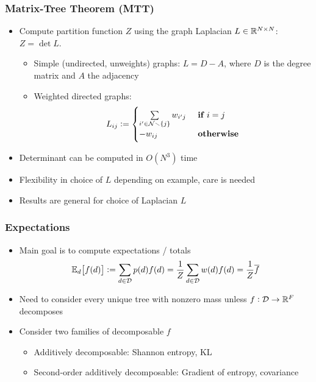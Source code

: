 \documentclass{beamer}
\newcommand{\defeq}{\vcentcolon=}
\begin{document}
\begin{frame}
\frametitle{Matrix-Tree Theorem (MTT)}

\begin{itemize}
\item Compute partition function $Z$ using the graph Laplacian $L\in\mathbb{R}^{N\times N}$:
$Z = \det{L}$.

    \begin{itemize}
    \item Simple (undirected, unweights) graphs: $L = D - A$,
        where $D$ is the degree matrix and $A$ the adjacency
    \item Weighted directed graphs: 
    \begin{equation*}\label{eq:lap}  
        L_{ij} \defeq 
        \begin{cases} 
        \sum\limits_{i'\in\nodes\setminus\{j\}}\wedge{i'j} & \textbf{ if } i=j \\ 
        -\wedge{ij} & \textbf{ otherwise} 
        \end{cases} 
    \end{equation*} 
    \end{itemize}

\item Determinant can be computed in $O(N^3)$ time
\item Flexibility in choice of $L$ depending on example,
    care is needed
\item Results are general for choice of Laplacian $L$
\end{itemize}
\end{frame}

\begin{frame}
\frametitle{Expectations}
\begin{itemize}
\item Main goal is to compute expectations / totals
    $$\expect{\tree}{f(\tree)} \defeq \sumtree\ptree{\tree}\treefunc{f}{\tree}
        = \frac{1}{Z}\sumtree w(\tree)f(\tree) = \frac{1}{Z} \bar f$$
\item Need to consider every unique tree with nonzero mass unless $f:{\mathcal{D}}\to\mathbb{R}^F$ decomposes
\item Consider two families of decomposable $f$
    \begin{itemize}
        \item Additively decomposable: Shannon entropy, KL
        \item Second-order additively decomposable: Gradient of entropy, covariance
    \end{itemize}
\end{itemize}
\end{frame}
\end{document}
